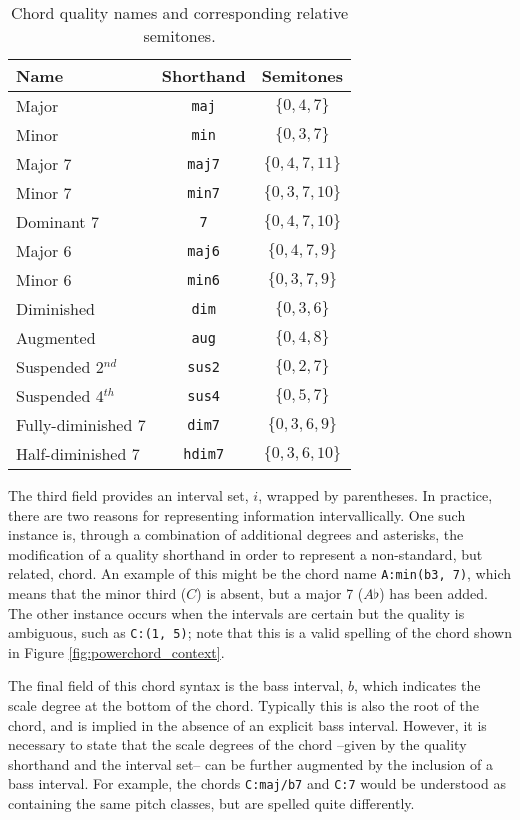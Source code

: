 \begin{table}[h]
\begin{center}
\caption{Chord quality names and corresponding relative semitones.}
\begin{tabular}{l | c | c}
Name & Shorthand & Semitones \\
\hline
Major & \texttt{maj} & $\{0, 4, 7\}$ \\
Minor & \texttt{min} & $\{0, 3, 7\}$ \\
Major 7 & \texttt{maj7} & $\{0, 4, 7, 11\}$ \\
Minor 7 & \texttt{min7} & $\{0, 3, 7, 10\}$ \\
Dominant 7 & \texttt{7} & $\{0, 4, 7, 10\}$ \\
Major 6 & \texttt{maj6} & $\{0, 4, 7, 9\}$ \\
Minor 6 & \texttt{min6} & $\{0, 3, 7, 9\}$ \\
Diminished & \texttt{dim} & $\{0, 3, 6\}$ \\
Augmented & \texttt{aug} & $\{0, 4, 8\}$ \\
Suspended 2$^{nd}$ & \texttt{sus2} & $\{0, 2, 7\}$ \\
Suspended 4$^{th}$ & \texttt{sus4} & $\{0, 5, 7\}$ \\
Fully-diminished 7 & \texttt{dim7} & $\{0, 3, 6, 9\}$ \\
Half-diminished 7 & \texttt{hdim7} & $\{0, 3, 6, 10\}$ \\
\hline
\end{tabular}
\label{tab:qualities}
\end{center}
\end{table}


The third field provides an interval set, $i$, wrapped by parentheses.
In practice, there are two reasons for representing information intervallically.
One such instance is, through a combination of additional degrees and asterisks, the modification of a quality shorthand in order to represent a non-standard, but related, chord.
An example of this might be the chord name \texttt{A:min(\*b3, 7)}, which means that the minor third ($C$) is absent, but a major 7 ($A\flat$) has been added.
The other instance occurs when the intervals are certain but the quality is ambiguous, such as \texttt{C:(1, 5)}; note that this is a valid spelling of the chord shown in Figure \ref{fig:powerchord_context}.

The final field of this chord syntax is the bass interval, $b$, which indicates the scale degree at the bottom of the chord.
Typically this is also the root of the chord, and is implied in the absence of an explicit bass interval.
However, it is necessary to state that the scale degrees of the chord --given by the quality shorthand and the interval set-- can be further augmented by the inclusion of a bass interval.
For example, the chords \texttt{C:maj/b7} and \texttt{C:7} would be understood as containing the same pitch classes, but are spelled quite differently.


